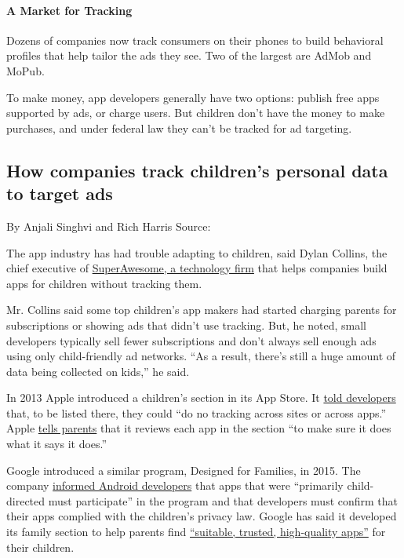 \hypertarget{a-market-for-tracking}{%
\paragraph{A Market for Tracking}\label{a-market-for-tracking}}

Dozens of companies now track consumers on their phones to build
behavioral profiles that help tailor the ads they see. Two of the
largest are AdMob and MoPub.

To make money, app developers generally have two options: publish free
apps supported by ads, or charge users. But children don't have the
money to make purchases, and under federal law they can't be tracked for
ad targeting.

\hypertarget{how-companies-track-childrens-personal-data-to-target-ads}{%
\subsection{How companies track children's personal data to target
ads}\label{how-companies-track-childrens-personal-data-to-target-ads}}

By Anjali Singhvi and Rich Harris \textbar{} Source:

The app industry has had trouble adapting to children, said Dylan
Collins, the chief executive of
\href{https://www.superawesome.tv/about-us}{SuperAwesome, a technology
firm} that helps companies build apps for children without tracking
them.

Mr. Collins said some top children's app makers had started charging
parents for subscriptions or showing ads that didn't use tracking. But,
he noted, small developers typically sell fewer subscriptions and don't
always sell enough ads using only child-friendly ad networks. ``As a
result, there's still a huge amount of data being collected on kids,''
he said.

In 2013 Apple introduced a children's section in its App Store. It
\href{https://asciiwwdc.com/2014/sessions/717}{told developers} that, to
be listed there, they could ``do no tracking across sites or across
apps.'' Apple \href{https://www.apple.com/families/}{tells parents} that
it reviews each app in the section ``to make sure it does what it says
it does.''

Google introduced a similar program, Designed for Families, in 2015. The
company
\href{https://web.archive.org/web/20180526145142/https://developer.android.com/distribute/google-play/families}{informed
Android developers} that apps that were ``primarily child-directed must
participate'' in the program and that developers must confirm that their
apps complied with the children's privacy law. Google has said it
developed its family section to help parents find
\href{https://web.archive.org/web/20180507231711/https://developer.android.com/distribute/google-play/families}{``suitable,
trusted, high-quality apps''} for their children.

